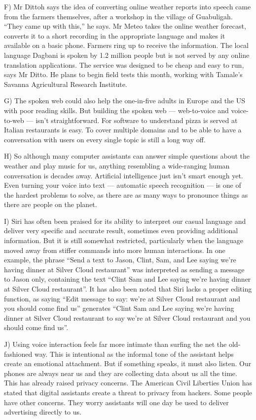 \documentclass[UTF8,11pt]{ctexart}
\begin{document}
F) Mr Dittoh says the idea of converting online weather reports into speech came from the farmers themselves, after a workshop in the village of Guabuligah. “They came up with this,” he says. Mr Meteo takes the online weather forecast, converts it to a short recording in the appropriate language and makes it available on a basic phone. Farmers ring up to receive the information. The local language Dagbani is spoken by 1.2 million people but is not served by any online translation applications. The service was designed to be cheap and easy to run, says Mr Ditto. He plans to begin field tests this month, working with Tamale’s Savanna Agricultural Research Institute.


G) The spoken web could also help the one-in-five adults in Europe and the US with poor reading skills. But building the spoken web — web-to-voice and voice-to-web — isn’t straightforward. For software to understand pizza is served at Italian restaurants is easy. To cover multiple domains and to be able to have a conversation with users on every single topic is still a long way off.


H) So although many computer assistants can answer simple questions about the weather and play music for us, anything resembling a wide-ranging human conversation is decades away. Artificial intelligence just isn’t smart enough yet. Even turning your voice into text — automatic speech recognition — is one of the hardest problems to solve, as there are as many ways to pronounce things as there are people on the planet.


I) Siri has often been praised for its ability to interpret our casual language and deliver very specific and accurate result, sometimes even providing additional information. But it is still somewhat restricted, particularly when the language moved away from stiffer commands into more human interactions. In one example, the phrase “Send a text to Jason, Clint, Sam, and Lee saying we’re having dinner at Silver Cloud restaurant” was interpreted as sending a message to Jason only, containing the text “Clint Sam and Lee saying we’re having dinner at Silver Cloud restaurant”. It has also been noted that Siri lacks a proper editing function, as saying “Edit message to say: we’re at Silver Cloud restaurant and you should come find us” generates “Clint Sam and Lee saying we’re having dinner at Silver Cloud restaurant to say we’re at Silver Cloud restaurant and you should come find us”.


J) Using voice interaction feels far more intimate than surfing the net the old-fashioned way. This is intentional as the informal tone of the assistant helps create an emotional attachment. But if something speaks, it must also listen. Our phones are always near us and they are collecting data about us all the time. This has already raised privacy concerns. The American Civil Liberties Union has stated that digital assistants create a threat to privacy from hackers. Some people have other concerns. They worry assistants will one day be used to deliver advertising directly to us.
\end{document}
